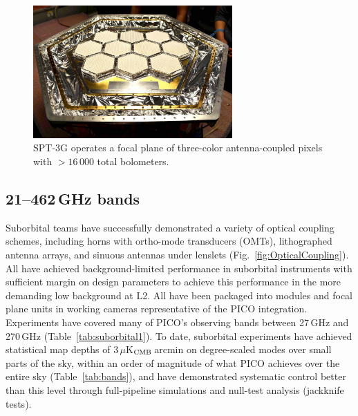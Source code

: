 
\begin{figure}[b]
\parbox{3.5in}{\centering
\includegraphics[width=3in]{figures/SPT3G.jpg} }
\parbox{3.0in}{
\caption{\captiontext 
  SPT-3G operates a focal plane of three-color antenna-coupled pixels with $>16\,000$ total bolometers.\label{fig:spt_fp}} }
\end{figure}


\subsection{21--462\,GHz bands}
\label{sec:bolometers} %

Suborbital teams have successfully demonstrated a variety of optical
coupling schemes, including horns with ortho-mode transducers (OMTs),
lithographed antenna arrays, and sinuous antennas under lenslets
(Fig.~\ref{fig:OpticalCoupling}). All have achieved background-limited
performance in suborbital instruments with sufficient margin on design
parameters to achieve this performance in the more demanding low
background at L2. All have been packaged into modules and focal plane
units in working cameras representative of the PICO integration.
Experiments have covered many of PICO's observing bands between
27\,GHz and 270\,GHz (Table~\ref{tab:suborbital1}). 
To date, suborbital experiments have achieved statistical map depths
of 3\,$\mu$K$_{\rm CMB}$\,arcmin on degree-scaled modes over small
parts of the sky, within an order of magnitude of what PICO achieves over the entire
sky (Table~\ref{tab:bands}), and have demonstrated systematic control
better than this level through full-pipeline simulations and null-test analysis
(jackknife tests). 


